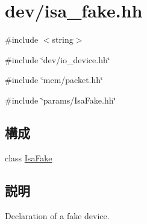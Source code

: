 \hypertarget{isa__fake_8hh}{
\section{dev/isa\_\-fake.hh}
\label{isa__fake_8hh}
}
{\ttfamily \#include $<$string$>$}\par
{\ttfamily \#include \char`\"{}dev/io\_\-device.hh\char`\"{}}\par
{\ttfamily \#include \char`\"{}mem/packet.hh\char`\"{}}\par
{\ttfamily \#include \char`\"{}params/IsaFake.hh\char`\"{}}\par
\subsection*{構成}
\begin{DoxyCompactItemize}
\item 
class \hyperlink{classIsaFake}{IsaFake}
\end{DoxyCompactItemize}


\subsection{説明}
Declaration of a fake device. 